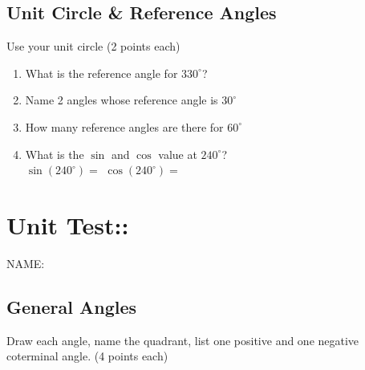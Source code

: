 \documentclass[12pt]{article}
\begin{document}
\subsection*{Unit Circle \& Reference Angles}

Use your unit circle (2 points each)\\

\begin{enumerate}[resume]

\item What is the reference angle for $330^\circ$?\\

\item Name 2 angles whose reference angle is $30^\circ$\\

\item How many reference angles are there for $60^\circ$\\

\item What is the $\sin$ and $\cos$ value at $240^\circ$?\\

$\sin(240^\circ)=$ \hspace{1in} $\cos(240^\circ)=$

\end{enumerate}

\section*{Unit Test::}

\hfill NAME:\underline{\hspace*{3in}}

\subsection*{General Angles}

Draw each angle, name the quadrant, list one positive and one negative coterminal angle. (4 points each)\\
\end{document}
